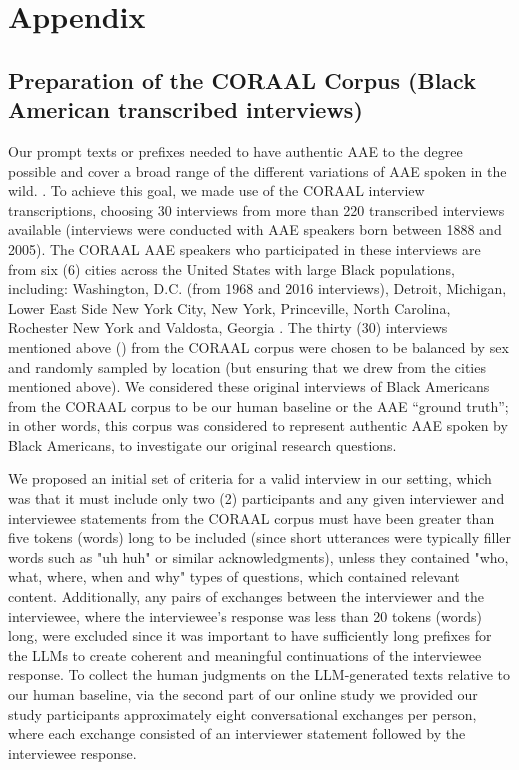\newpage \onecolumn
\section{Appendix} \label{sec:appendix}

\subsection{Preparation of the CORAAL Corpus (Black American transcribed interviews)} \label{apdx:corral_desc}

Our prompt texts or prefixes needed to have authentic AAE to the degree possible and cover a broad range of the different variations of AAE spoken in the wild. \cite{lanehart_1language_2015}. To achieve this goal, we made use of the CORAAL interview transcriptions, choosing 30 interviews from more than 220 transcribed interviews available (interviews were conducted with AAE speakers born between 1888 and 2005). The CORAAL AAE speakers who participated in these interviews are from six (6) cities across the United States with large Black populations, including: Washington, D.C. (from 1968 and 2016 interviews), Detroit, Michigan, Lower East Side New York City, New York, Princeville, North Carolina, Rochester New York and Valdosta, Georgia \cite{KendallFarrington2023}. The thirty (30) interviews mentioned above () from the CORAAL corpus were chosen to be balanced by sex and randomly sampled by location (but ensuring that we drew from the cities mentioned above). We considered these original interviews of Black Americans from the CORAAL corpus to be our human baseline or the AAE ``ground truth''; in other words, this corpus was considered to represent authentic AAE spoken by Black Americans, to investigate our original research questions. 

We proposed an initial set of criteria for a valid interview in our setting, which was that it must include only two (2) participants and any given interviewer and interviewee statements from the CORAAL corpus must have been greater than five tokens (words) long to be included (since short utterances were typically filler words such as "uh huh" or similar acknowledgments), unless they contained "who, what, where, when and why" types of questions, which contained relevant content. Additionally, any pairs of exchanges between the interviewer and the interviewee, where the interviewee's response was less than 20 tokens (words) long, were excluded since it was important to have sufficiently long prefixes for the LLMs to create coherent and meaningful continuations of the interviewee response. To collect the human judgments on the LLM-generated texts relative to our human baseline, via the second part of our online study we provided our study participants approximately eight conversational exchanges per person, where each exchange consisted of an interviewer statement followed by the interviewee response. 

